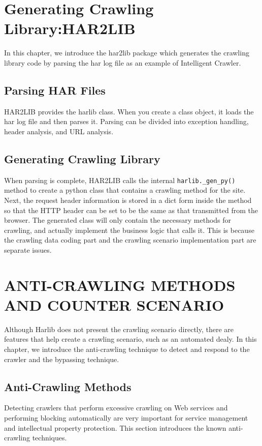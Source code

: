 \documentclass[letterpaper, 10 pt, conference]{ieeeconf}
\begin{document}
%
%
\section{Generating Crawling Library:HAR2LIB}
In this chapter, we introduce the har2lib package which generates the crawling library code by parsing the har log file as an example of Intelligent Crawler.

\subsection{Parsing HAR Files}
HAR2LIB provides the harlib class. When you create a class object, it loads the har log file and then parses it. Parsing can be divided into exception handling, header analysis, and URL analysis.

\subsection{Generating Crawling Library}
When parsing is complete, HAR2LIB calls the internal \newline\verb|harlib._gen_py()| method to create a python class that contains a crawling method for the site. Next, the request header information is stored in a dict form inside the method so that the HTTP header can be set to be the same as that transmitted from the browser. The generated class will only contain the necessary methods for crawling, and actually implement the business logic that calls it. This is because the crawling data coding part and the crawling scenario implementation part are separate issues.



%
%
\section{ANTI-CRAWLING METHODS AND COUNTER SCENARIO}
Although Harlib does not present the crawling scenario directly, there are features that help create a crawling scenario, such as an automated dealy. In this chapter, we introduce the anti-crawling technique to detect and respond to the crawler and the bypassing technique.

\subsection{Anti-Crawling Methods}
Detecting crawlers that perform excessive crawling on Web services and performing blocking automatically are very important for service management and intellectual property protection. This section introduces the known anti-crawling techniques.
\end{document}
